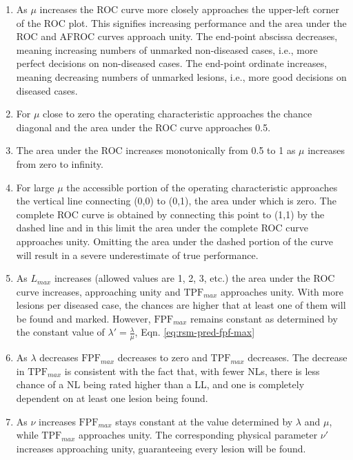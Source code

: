 \documentclass[
]{book}
\providecommand{\tightlist}{%
  \setlength{\itemsep}{0pt}\setlength{\parskip}{0pt}}
\begin{document}
\begin{enumerate}
\def\labelenumi{\arabic{enumi}.}
\tightlist
\item
  As \(\mu\) increases the ROC curve more closely approaches the upper-left corner of the ROC plot. This signifies increasing performance and the area under the ROC and AFROC curves approach unity. The end-point abscissa decreases, meaning increasing numbers of unmarked non-diseased cases, i.e., more perfect decisions on non-diseased cases. The end-point ordinate increases, meaning decreasing numbers of unmarked lesions, i.e., more good decisions on diseased cases.
\item
  For \(\mu\) close to zero the operating characteristic approaches the chance diagonal and the area under the ROC curve approaches 0.5.
\item
  The area under the ROC increases monotonically from 0.5 to 1 as \(\mu\) increases from zero to infinity.
\item
  For large \(\mu\) the accessible portion of the operating characteristic approaches the vertical line connecting (0,0) to (0,1), the area under which is zero. The complete ROC curve is obtained by connecting this point to (1,1) by the dashed line and in this limit the area under the complete ROC curve approaches unity. Omitting the area under the dashed portion of the curve will result in a severe underestimate of true performance.
\item
  As \(L_{max}\) increases (allowed values are 1, 2, 3, etc.) the area under the ROC curve increases, approaching unity and \(\text{TPF}_{max}\) approaches unity. With more lesions per diseased case, the chances are higher that at least one of them will be found and marked. However, \(\text{FPF}_{max}\) remains constant as determined by the constant value of \(\lambda' = \frac{\lambda}{\mu}\), Eqn. \eqref{eq:rsm-pred-fpf-max}
\item
  As \(\lambda\) decreases \(\text{FPF}_{max}\) decreases to zero and \(\text{TPF}_{max}\) decreases. The decrease in \(\text{TPF}_{max}\) is consistent with the fact that, with fewer NLs, there is less chance of a NL being rated higher than a LL, and one is completely dependent on at least one lesion being found.
\item
  As \(\nu\) increases \(\text{FPF}_{max}\) stays constant at the value determined by \(\lambda\) and \(\mu\), while \(\text{TPF}_{max}\) approaches unity. The corresponding physical parameter \(\nu'\) increases approaching unity, guaranteeing every lesion will be found.
\end{enumerate}
\end{document}
